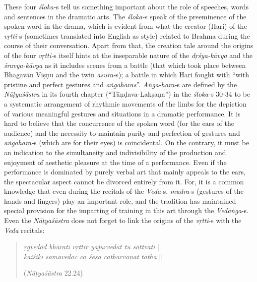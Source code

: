 These four \textsl{śloka-}s tell us something important about the role of speeches, words and sentences in the dramatic arts. The \textsl{śloka-}s speak of the preeminence of the spoken word in the drama, which is evident from what the creator (Hari) of the \textsl{vṛtti-}s (sometimes translated into English as style) related to Brahma during the course of their conversation. Apart from that, the creation tale around the origins of the four \textsl{vṛtti-}s itself hints at the inseparable nature of the \textsl{dṛśya-kāvya} and the \textsl{śravya-kāvya} as it includes scenes from a battle (that which took place between Bhagavān Viṣṇu and the twin \textsl{asura-}s); a battle in which Hari fought with “with pristine and perfect gestures and \textsl{aṅgahāras}”. \textsl{Aṅga-hāra-}s are defined by the \textsl{Nāṭyaśāstra} in its fourth chapter (“Tāṇḍava-Lakṣaṇa”) in the \textsl{śloka-}s 30-34 to be a systematic arrangement of rhythmic movements of the limbs for the depiction of various meaningful gestures and situations in a dramatic performance. It is hard to believe that the concurrence of the spoken word (for the ears of the audience) and the necessity to maintain purity and perfection of gestures and \textsl{aṅgahāra-}s (which are for their eyes) is coincidental. On the contrary, it must be an indication to the simultaneity and indivisibility of the production and enjoyment of aesthetic pleasure at the time of a performance. Even if the performance is dominated by purely verbal art that mainly appeals to the ears, the spectacular aspect cannot be divorced entirely from it. For, it is a common knowledge that even during the recitals of the \textsl{Veda}-s, \textsl{mudra}-s (gestures of the hands and fingers) play an important role, and the tradition has maintained special provision for the imparting of training in this art through the \textsl{Vedāṅga}-s. Even the \textsl{Nāṭyaśāstra} does not forget to link the origins of the \textsl{vṛtti}-s with the \textsl{Veda} recitals: 
\begin{quote}
\textsl{ṛgvedād bhāratī vṛttir yajurvedāt tu sāttvatī} |    \\
\textsl{kaiśikī sāmavedāc ca śeṣā cātharvaņāt tathā} ||

\hfill(\textsl{Nāṭyaśāstra} 22.24)
\end{quote}

